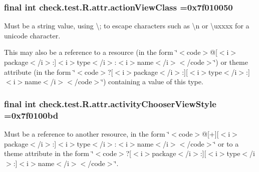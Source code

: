 \subsubsection[{action\+View\+Class}]{\setlength{\rightskip}{0pt plus 5cm}final int check.\+test.\+R.\+attr.\+action\+View\+Class =0x7f010050\hspace{0.3cm}{\ttfamily [static]}}\label{classcheck_1_1test_1_1_r_1_1attr_aabc7490f827174f67e409de2dd06c2cb}
Must be a string value, using \textquotesingle{}\textbackslash{};\textquotesingle{} to escape characters such as \textquotesingle{}\textbackslash{}n\textquotesingle{} or \textquotesingle{}\textbackslash{}uxxxx\textquotesingle{} for a unicode character. 

This may also be a reference to a resource (in the form \char`\"{}$<$code$>$@\mbox{[}$<$i$>$package$<$/i$>$\+:\mbox{]}$<$i$>$type$<$/i$>$\+:$<$i$>$name$<$/i$>$$<$/code$>$\char`\"{}) or theme attribute (in the form \char`\"{}$<$code$>$?\mbox{[}$<$i$>$package$<$/i$>$\+:\mbox{]}\mbox{[}$<$i$>$type$<$/i$>$\+:\mbox{]}$<$i$>$name$<$/i$>$$<$/code$>$\char`\"{}) containing a value of this type. \hypertarget{classcheck_1_1test_1_1_r_1_1attr_a112293f577f9e7451b663966a7cabb2b}{}
\subsubsection[{activity\+Chooser\+View\+Style}]{\setlength{\rightskip}{0pt plus 5cm}final int check.\+test.\+R.\+attr.\+activity\+Chooser\+View\+Style =0x7f0100bd\hspace{0.3cm}{\ttfamily [static]}}\label{classcheck_1_1test_1_1_r_1_1attr_a112293f577f9e7451b663966a7cabb2b}
Must be a reference to another resource, in the form \char`\"{}$<$code$>$@\mbox{[}+\mbox{]}\mbox{[}$<$i$>$package$<$/i$>$\+:\mbox{]}$<$i$>$type$<$/i$>$\+:$<$i$>$name$<$/i$>$$<$/code$>$\char`\"{} or to a theme attribute in the form \char`\"{}$<$code$>$?\mbox{[}$<$i$>$package$<$/i$>$\+:\mbox{]}\mbox{[}$<$i$>$type$<$/i$>$\+:\mbox{]}$<$i$>$name$<$/i$>$$<$/code$>$\char`\"{}. \hypertarget{classcheck_1_1test_1_1_r_1_1attr_abc36e528bd90cfdb9882099faa4fe301}{}
